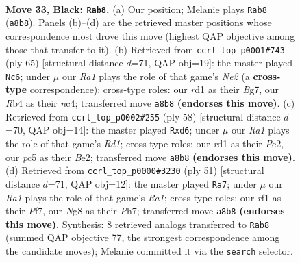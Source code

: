 \documentclass[11pt]{article}
\begin{document}
\clearpage

\begin{figure}[p]\centering
\begin{subfigure}{0.46\textwidth}\centering
\resizebox{\linewidth}{!}{%
\newchessgame
\chessboard[
  setfen={r1k3nb/p4p1p/P1p5/2P5/1r2P3/6N1/5B2/3R1RK1 b - - 2 33},
  showmover=false,
  pgfstyle=straightmove, color=movearrow, markmove={a8-b8}
]}
\caption{}
\end{subfigure}\hfill
\begin{subfigure}{0.46\textwidth}\centering
\resizebox{\linewidth}{!}{%
\newchessgame
\chessboard[
  setfen={1r4k1/4n1b1/p5p1/4p2p/1PN1P3/7P/3B2P1/4RK2 b - - 0 33},
  showmover=false,
  pgfstyle=straightmove, color=movearrow, markmove={e7-c6}
]}
\caption{}
\end{subfigure}
\\[4pt]
\begin{subfigure}{0.46\textwidth}\centering
\resizebox{\linewidth}{!}{%
\newchessgame
\chessboard[
  setfen={2b2rk1/6p1/p2bp1np/8/NP2P2P/8/2P1B3/2KR4 w - - 0 30},
  showmover=false,
  pgfstyle=straightmove, color=movearrow, markmove={d1-d6}
]}
\caption{}
\end{subfigure}\hfill
\begin{subfigure}{0.46\textwidth}\centering
\resizebox{\linewidth}{!}{%
\newchessgame
\chessboard[
  setfen={r1k5/5p1p/p1n1p3/8/P7/8/PB2KPrP/3R3R b - - 1 26},
  showmover=false,
  pgfstyle=straightmove, color=movearrow, markmove={a8-a7}
]}
\caption{}
\end{subfigure}
\caption{\textbf{Move 33, Black: \texttt{Rab8}.} (a) Our position; Melanie plays \texttt{Rab8} (\texttt{a8b8}). Panels (b)--(d) are the retrieved master positions whose correspondence most drove this move (highest QAP objective among those that transfer to it). (b) Retrieved from \texttt{ccrl\_top\_p0001\#743} (ply 65) [structural distance $d$=71, QAP obj=19]: the master played \texttt{Nc6}; under $\mu$ our \emph{Ra1} plays the role of that game's \emph{Ne2} (a \textbf{cross-type} correspondence); cross-type roles: our \emph{r}d1 as their \emph{B}g7, our \emph{R}b4 as their \emph{n}c4; transferred move \texttt{a8b8} \textbf{(endorses this move)}. (c) Retrieved from \texttt{ccrl\_top\_p0002\#255} (ply 58) [structural distance $d$=70, QAP obj=14]: the master played \texttt{Rxd6}; under $\mu$ our \emph{Ra1} plays the role of that game's \emph{Rd1}; cross-type roles: our \emph{r}d1 as their \emph{P}c2, our \emph{p}c5 as their \emph{B}e2; transferred move \texttt{a8b8} \textbf{(endorses this move)}. (d) Retrieved from \texttt{ccrl\_top\_p0000\#3230} (ply 51) [structural distance $d$=71, QAP obj=12]: the master played \texttt{Ra7}; under $\mu$ our \emph{Ra1} plays the role of that game's \emph{Ra1}; cross-type roles: our \emph{r}f1 as their \emph{P}f7, our \emph{N}g8 as their \emph{P}h7; transferred move \texttt{a8b8} \textbf{(endorses this move)}. Synthesis: 8 retrieved analogs transferred to \texttt{Rab8} (summed QAP objective 77, the strongest correspondence among the candidate moves); Melanie committed it via the \texttt{search} selector.}
\label{fig:thought-m65}
\end{figure}
\end{document}
